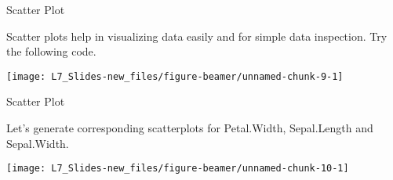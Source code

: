 \documentclass[ignorenonframetext,]{beamer}
\newenvironment{Shaded}{\begin{snugshade}}{\end{snugshade}}
\newcommand{\KeywordTok}[1]{\textcolor[rgb]{0.13,0.29,0.53}{\textbf{{#1}}}}
\newcommand{\DataTypeTok}[1]{\textcolor[rgb]{0.13,0.29,0.53}{{#1}}}
\newcommand{\DecValTok}[1]{\textcolor[rgb]{0.00,0.00,0.81}{{#1}}}
\newcommand{\StringTok}[1]{\textcolor[rgb]{0.31,0.60,0.02}{{#1}}}
\newcommand{\NormalTok}[1]{{#1}}
\begin{document}
\begin{frame}[fragile]{Scatter Plot}

Scatter plots help in visualizing data easily and for simple data
inspection. Try the following code.

\small

\begin{Shaded}
\end{Shaded}

\begin{center}\texttt{[image: L7\_Slides-new\_files/figure-beamer/unnamed-chunk-9-1]} \end{center}

\end{frame}

\begin{frame}[fragile]{Scatter Plot}

Let's generate corresponding scatterplots for Petal.Width, Sepal.Length
and Sepal.Width.

\small

\begin{Shaded}
\end{Shaded}

\begin{center}\texttt{[image: L7\_Slides-new\_files/figure-beamer/unnamed-chunk-10-1]} \end{center}

\end{frame}
\end{document}
